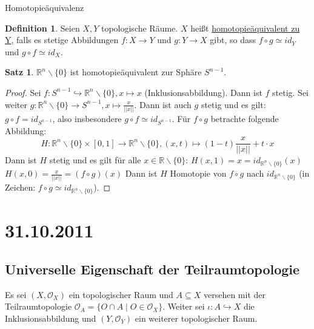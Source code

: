 \documentclass[a4paper,11pt,notitlepage]{report}
\theoremstyle{definition}
\newtheorem{definition}{Definition}[chapter]
\newtheorem{theorem}{Satz}[chapter]
\newcommand{\R}{{\ensuremath{\mathbb{R}}}}
\newcommand{\OO}{{\ensuremath{\mathcal{O}}}}
\begin{document}
\begin{section}{Homotopieäquivalenz}
	\begin{definition}
		Seien $X,Y$ topologische Räume. $X$ heißt \underline{homotopieäquivalent zu Y}, falls es stetige Abbildungen $f \colon X \rightarrow Y$ und $g \colon Y \rightarrow X$ gibt, so dass $f \circ g \simeq id_Y$ und $g \circ f \simeq id_X$.
	\end{definition}
	
	\begin{theorem}
		$\R^n \backslash \{0\}$ ist homotopieäquivalent zur Sphäre $S^{n-1}$.
	\end{theorem}
	
	\begin{proof}
		Sei $f \colon S^{n-1} \hookrightarrow \R^n \backslash \{0\}, x \mapsto x$ (Inklusionsabbildung). Dann ist $f$ stetig.
		\newline
		Sei weiter $g \colon \R^n \backslash \{0\} \rightarrow S^{n-1}, x \mapsto \frac{x}{||x||}$. Dann ist auch $g$ stetig und es gilt:
		$g \circ f = id_{S^{n-1}}$, also insbesondere $g \circ f \simeq id_{S^{n-1}}$.
		\newline
		Für $f \circ g$ betrachte folgende Abbildung:
		$$H \colon \R^n \backslash \{0\} \times [0,1] \rightarrow \R^n \backslash \{0\}, (x,t) \mapsto (1-t) \frac{x}{||x||} + t \cdot x$$
		Dann ist $H$ stetig und es gilt für alle $x \in \R \backslash \{0\}$:
		\newline
		$H(x,1) = x = id_{\R^n \backslash \{0\}}(x)$
		\newline
		$H(x,0) = \frac{x}{||x||} = (f \circ g)(x)$
		\newline
		Dann ist $H$ Homotopie von $f \circ g$ nach $id_{\R^n \backslash \{0\}}$ (in Zeichen: $f \circ g \simeq id_{\R^n \backslash \{0\}}$).
	\end{proof}
\end{section}

\chapter{31.10.2011}
\section{Universelle Eigenschaft der Teilraumtopologie}
Es sei $(X, \OO_X)$ ein topologischer Raum und $A \subseteq X$ versehen mit der Teilraumtopologie $\OO_A = \{ O \cap A \mid O \in \OO_X \}$. 
Weiter sei $\iota \colon A \hookrightarrow X$ die Inklusionsabbildung und $(Y, \OO_Y)$ ein weiterer topologischer Raum.
\end{document}
